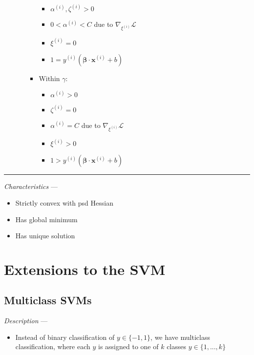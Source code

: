 \begin{itemize}
\begin{itemize}
\begin{itemize}
\begin{itemize}
                \item $\alpha^{(i)}, \zeta^{(i)} > 0$
                \item $0 < \alpha^{(i)} < C$ due to $\nabla_{\xi^{(i)}} \mathcal{L}$
                \item $\xi^{(i)} = 0$
                \item $1 = y^{(i)} (\boldsymbol{\beta} \cdot \boldsymbol{x}^{(i)} + b)$
            \end{itemize}
            \item Within $\gamma$:
            \begin{itemize}
                \item $\alpha^{(i)} > 0$
                \item $\zeta^{(i)} = 0$
                \item $\alpha^{(i)} = C$ due to $\nabla_{\xi^{(i)}} \mathcal{L}$
                \item $\xi^{(i)} > 0$
                \item $1 > y^{(i)} (\boldsymbol{\beta} \cdot \boldsymbol{x}^{(i)} + b)$
            \end{itemize}
        \end{itemize}
    \end{itemize}
\end{itemize}

{\color{lightgray}\hrule height 0.001mm}

\emph{Characteristics} --- 
\begin{itemize}
    \item Strictly convex with psd Hessian
    \item Has global minimum
    \item Has unique solution
\end{itemize}

\section{Extensions to the SVM}
\subsection*{Multiclass SVMs}
\emph{Description} --- 
\begin{itemize}
    \item Instead of binary classification of $y \in \{-1,1\}$, we have multiclass classification, where each $y$ is assigned to one of $k$ classes $y \in \{1,...,k\}$
\end{itemize}


